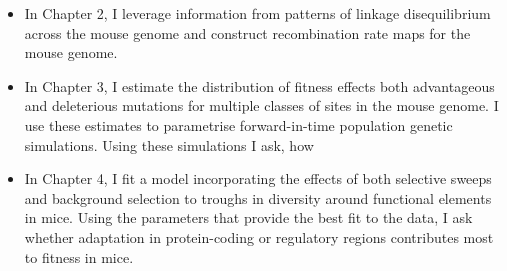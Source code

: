 	\begin{itemize}
	
	\item In Chapter 2, I leverage information from patterns of linkage disequilibrium across the mouse genome and construct recombination rate maps for the mouse genome. 
	
	\item In Chapter 3, I estimate the distribution of fitness effects both advantageous and deleterious mutations for multiple classes of sites in the mouse genome. I use these estimates to parametrise forward-in-time population genetic simulations. Using these simulations I ask, how 
	
	\item In Chapter 4, I fit a model incorporating the effects of both selective sweeps and background selection to troughs in diversity around functional elements in mice. Using the parameters that provide the best fit to the data, I ask whether adaptation in protein-coding or  regulatory regions contributes most to fitness in mice.
	
	\end{itemize}

